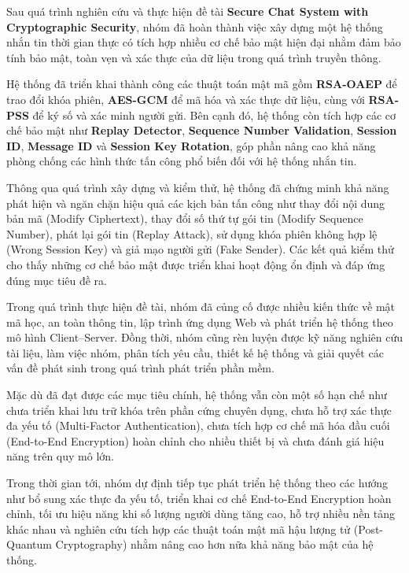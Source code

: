 
Sau quá trình nghiên cứu và thực hiện đề tài \textbf{Secure Chat System with Cryptographic Security}, nhóm đã hoàn thành việc xây dựng một hệ thống nhắn tin thời gian thực có tích hợp nhiều cơ chế bảo mật hiện đại nhằm đảm bảo tính bảo mật, toàn vẹn và xác thực của dữ liệu trong quá trình truyền thông.

Hệ thống đã triển khai thành công các thuật toán mật mã gồm \textbf{RSA-OAEP} để trao đổi khóa phiên, \textbf{AES-GCM} để mã hóa và xác thực dữ liệu, cùng với \textbf{RSA-PSS} để ký số và xác minh người gửi. Bên cạnh đó, hệ thống còn tích hợp các cơ chế bảo mật như \textbf{Replay Detector}, \textbf{Sequence Number Validation}, \textbf{Session ID}, \textbf{Message ID} và \textbf{Session Key Rotation}, góp phần nâng cao khả năng phòng chống các hình thức tấn công phổ biến đối với hệ thống nhắn tin.

Thông qua quá trình xây dựng và kiểm thử, hệ thống đã chứng minh khả năng phát hiện và ngăn chặn hiệu quả các kịch bản tấn công như thay đổi nội dung bản mã (Modify Ciphertext), thay đổi số thứ tự gói tin (Modify Sequence Number), phát lại gói tin (Replay Attack), sử dụng khóa phiên không hợp lệ (Wrong Session Key) và giả mạo người gửi (Fake Sender). Các kết quả kiểm thử cho thấy những cơ chế bảo mật được triển khai hoạt động ổn định và đáp ứng đúng mục tiêu đề ra.

Trong quá trình thực hiện đề tài, nhóm đã củng cố được nhiều kiến thức về mật mã học, an toàn thông tin, lập trình ứng dụng Web và phát triển hệ thống theo mô hình Client--Server. Đồng thời, nhóm cũng rèn luyện được kỹ năng nghiên cứu tài liệu, làm việc nhóm, phân tích yêu cầu, thiết kế hệ thống và giải quyết các vấn đề phát sinh trong quá trình phát triển phần mềm.

Mặc dù đã đạt được các mục tiêu chính, hệ thống vẫn còn một số hạn chế như chưa triển khai lưu trữ khóa trên phần cứng chuyên dụng, chưa hỗ trợ xác thực đa yếu tố (Multi-Factor Authentication), chưa tích hợp cơ chế mã hóa đầu cuối (End-to-End Encryption) hoàn chỉnh cho nhiều thiết bị và chưa đánh giá hiệu năng trên quy mô lớn.

Trong thời gian tới, nhóm dự định tiếp tục phát triển hệ thống theo các hướng như bổ sung xác thực đa yếu tố, triển khai cơ chế End-to-End Encryption hoàn chỉnh, tối ưu hiệu năng khi số lượng người dùng tăng cao, hỗ trợ nhiều nền tảng khác nhau và nghiên cứu tích hợp các thuật toán mật mã hậu lượng tử (Post-Quantum Cryptography) nhằm nâng cao hơn nữa khả năng bảo mật của hệ thống.